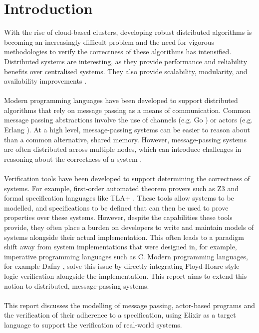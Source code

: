 \chapter{Introduction}
With the rise of cloud-based clusters, developing robust distributed algorithms is becoming an increasingly difficult problem and the need for vigorous methodologies to verify the correctness of these algorithms has intensified. Distributed systems are interesting, as they provide performance and reliability benefits over centralised systems. They also provide scalability, modularity, and availability improvements \cite{cachin}.
\\ \\ 
Modern programming languages have been developed to support distributed algorithms that rely on message passing as a means of communication. Common message passing abstractions involve the use of channels (e.g. Go \cite{go}) or actors \cite{actor} (e.g. Erlang \cite{erlang}). At a high level, message-passing systems can be easier to reason about than a common alternative, shared memory. However, message-passing systems are often distributed across multiple nodes, which can introduce challenges in reasoning about the correctness of a system \cite{science_of_systems}.
\\ \\
Verification tools have been developed to support determining the correctness of systems. For example, first-order automated theorem provers such as Z3 \cite{z3} and formal specification languages like TLA+ \cite{tlaplus}. These tools allow systems to be modelled, and specifications to be defined that can then be used to prove properties over these systems. However, despite the capabilities these tools provide, they often place a burden on developers to write and maintain models of systems alongside their actual implementation. This often leads to a paradigm shift away from system implementations that were designed in, for example, imperative programming languages such as C. Modern programming languages, for example Dafny \cite{dafny}, solve this issue by directly integrating Floyd-Hoare style logic verification alongside the implementation. This report aims to extend this notion to distributed, message-passing systems.
\\ \\
This report discusses the modelling of message passing, actor-based programs and the verification of their adherence to a specification, using Elixir as a target language to support the verification of real-world systems.
